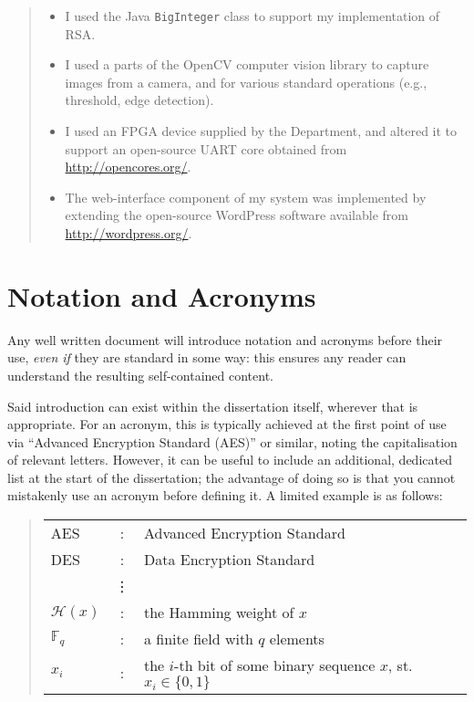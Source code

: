 \documentclass[ %
                    author={Lucas O'Dowd-Jones},
                supervisor={Dr. Alex Kavvos},
                    degree={MEng},
                     title={Variations on Normalisation by Evaluation in Haskell},
                  subtitle={},
                      type={programming languages},
                      year={2021} ]{dissertation}
\begin{document}
\begin{quote}
\noindent
\begin{itemize}
\item I used the Java {\tt BigInteger} class to support my implementation 
      of RSA.
\item I used a parts of the OpenCV computer vision library to capture 
      images from a camera, and for various standard operations (e.g., 
      threshold, edge detection).
\item I used an FPGA device supplied by the Department, and altered it 
      to support an open-source UART core obtained from 
      \url{http://opencores.org/}.
\item The web-interface component of my system was implemented by 
      extending the open-source WordPress software available from
      \url{http://wordpress.org/}.
\end{itemize}
\end{quote}


\chapter*{Notation and Acronyms}


\noindent
Any well written document will introduce notation and acronyms before
their use, {\em even if} they are standard in some way: this ensures 
any reader can understand the resulting self-contained content.  

Said introduction can exist within the dissertation itself, wherever 
that is appropriate.  For an acronym, this is typically achieved at 
the first point of use via ``Advanced Encryption Standard (AES)'' or 
similar, noting the capitalisation of relevant letters.  However, it 
can be useful to include an additional, dedicated list at the start 
of the dissertation; the advantage of doing so is that you cannot 
mistakenly use an acronym before defining it.  A limited example is 
as follows:

\begin{quote}
\noindent
\begin{tabular}{lcl}
AES                 &:     & Advanced Encryption Standard                                         \\
DES                 &:     & Data Encryption Standard                                             \\
                    &\vdots&                                                                      \\
${\mathcal H}( x )$ &:     & the Hamming weight of $x$                                            \\
${\mathbb  F}_q$    &:     & a finite field with $q$ elements                                     \\
$x_i$               &:     & the $i$-th bit of some binary sequence $x$, st. $x_i \in \{ 0, 1 \}$ \\
\end{tabular}
\end{quote}
\end{document}
